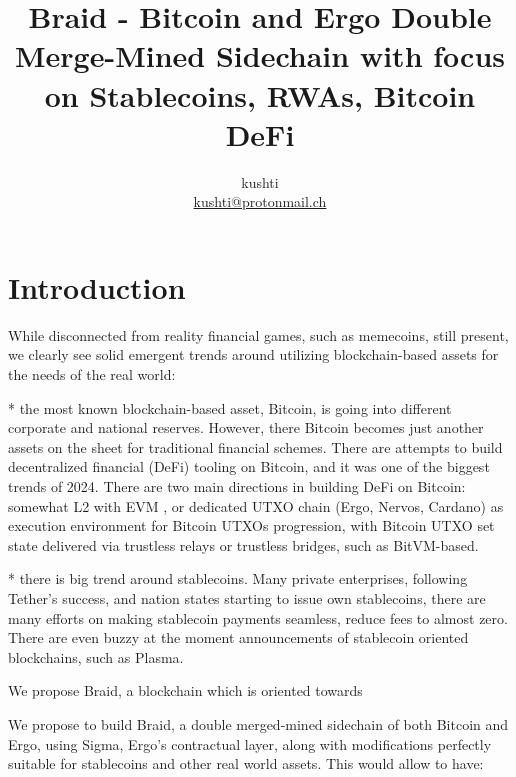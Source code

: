 \documentclass{llncs}   %
\newcommand{\bc}{Braid}
\begin{document}
\title{\bc{} - Bitcoin and Ergo Double Merge-Mined Sidechain with focus on Stablecoins, RWAs, Bitcoin DeFi}

\author{kushti \\ \href{mailto:kushti@protonmail.ch}{kushti@protonmail.ch}}


\maketitle

\begin{abstract}
\end{abstract}

\section{Introduction}

While disconnected from reality financial games, such as memecoins, still present, we clearly see solid emergent trends around utilizing 
blockchain-based assets for the needs of the real world:

* the most known blockchain-based asset, Bitcoin, is going into different corporate and national reserves. However, there Bitcoin becomes just another assets on the sheet for traditional financial schemes. There are attempts to build decentralized financial (DeFi) tooling on Bitcoin, and it was one of the biggest trends of 2024. There are two main directions in building DeFi on Bitcoin: somewhat L2 with EVM , or dedicated UTXO chain (Ergo, Nervos, Cardano) as execution environment for Bitcoin UTXOs progression, with Bitcoin UTXO set state delivered via trustless relays or trustless bridges, such as BitVM-based.

* there is big trend around stablecoins. Many private enterprises, following Tether's success, and nation states starting to issue own stablecoins, there are many efforts on making stablecoin payments seamless, reduce fees to almost zero. There are even buzzy at the moment 
announcements of stablecoin oriented blockchains, such as Plasma. 

We propose \bc{}, a blockchain which is oriented towards 

We propose to build Braid, a double merged-mined sidechain of both Bitcoin and Ergo, using Sigma, Ergo's contractual layer, along with modifications perfectly suitable for stablecoins and other real world assets. This would allow to have:
\end{document}

